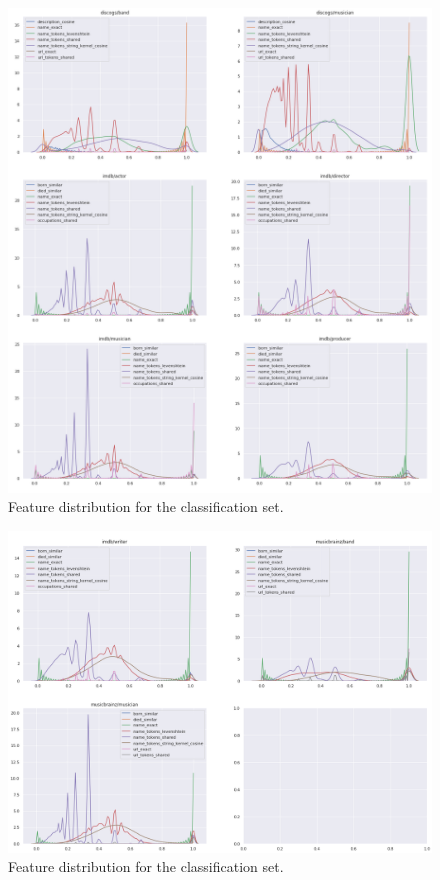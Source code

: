 \documentclass[epsfig,a4paper,11pt,titlepage,twoside,openany]{book}
\begin{document}
\begin{figure}[H]
  \centering \includegraphics[width=\textwidth]{classification_feature_distribution} 
  \caption{Feature distribution for the classification set.}
  \label{fig:distribution-of-classification-features-1}
\end{figure}

\begin{figure}[H]
  \centering \includegraphics[width=\textwidth]{classification_feature_distribution_2} 
  \caption{Feature distribution for the classification set.}
  \label{fig:distribution-of-classification-features-2}
\end{figure}
\end{document}
